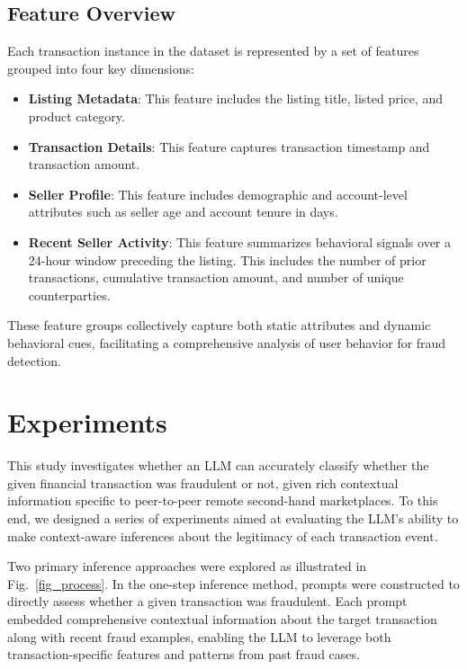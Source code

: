 \documentclass[sigconf]{acmart}
\begin{document}
\subsection{Feature Overview}\label{feature_overview}
Each transaction instance in the dataset is represented by a set of features grouped into four key dimensions:

\begin{itemize}
    \item \textbf{Listing Metadata}: This feature includes the listing title, listed price, and product category.
    \item \textbf{Transaction Details}: This feature captures transaction timestamp and transaction amount.
    \item \textbf{Seller Profile}: This feature includes demographic and account-level attributes such as seller age and account tenure in days.
    \item \textbf{Recent Seller Activity}: This feature summarizes behavioral signals over a 24-hour window preceding the listing. This includes the number of prior transactions, cumulative transaction amount, and number of unique counterparties.
\end{itemize}

These feature groups collectively capture both static attributes and dynamic behavioral cues, facilitating a comprehensive analysis of user behavior for fraud detection.







\section{Experiments}

This study investigates whether an LLM can accurately classify whether the given financial transaction was fraudulent or not, given rich contextual information specific to peer-to-peer remote second-hand marketplaces. To this end, we designed a series of experiments aimed at evaluating the LLM's ability to make context-aware inferences about the legitimacy of each transaction event.

Two primary inference approaches were explored as illustrated in Fig.~\ref{fig_process}. In the one-step inference method, prompts were constructed to directly assess whether a given transaction was fraudulent. Each prompt embedded comprehensive contextual information about the target transaction along with recent fraud examples, enabling the LLM to leverage both transaction-specific features and patterns from past fraud cases.
\end{document}

